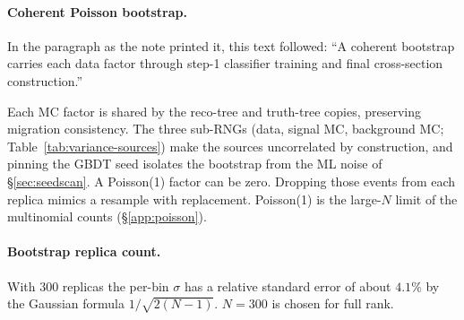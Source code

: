 \paragraph{Coherent Poisson bootstrap.} In the paragraph as the note printed it, this text followed: ``A coherent bootstrap carries each data factor through step-1 classifier training and final cross-section construction.''\par Each MC factor is shared by the reco-tree and truth-tree copies, preserving migration consistency. The three sub-RNGs (data, signal MC, background MC; Table~\ref{tab:variance-sources}) make the sources uncorrelated by construction, and pinning the GBDT seed isolates the bootstrap from the ML noise of \S\ref{sec:seedscan}. A Poisson(1) factor can be zero. Dropping those events from each replica mimics a resample with replacement. Poisson(1) is the large-$N$ limit of the multinomial counts (\S\ref{app:poisson}).

\paragraph{Bootstrap replica count.} With $300$ replicas the per-bin $\sigma$ has a relative standard error of about $4.1\%$ by the Gaussian formula $1/\sqrt{2(N-1)}$. $N=300$ is chosen for full rank.

